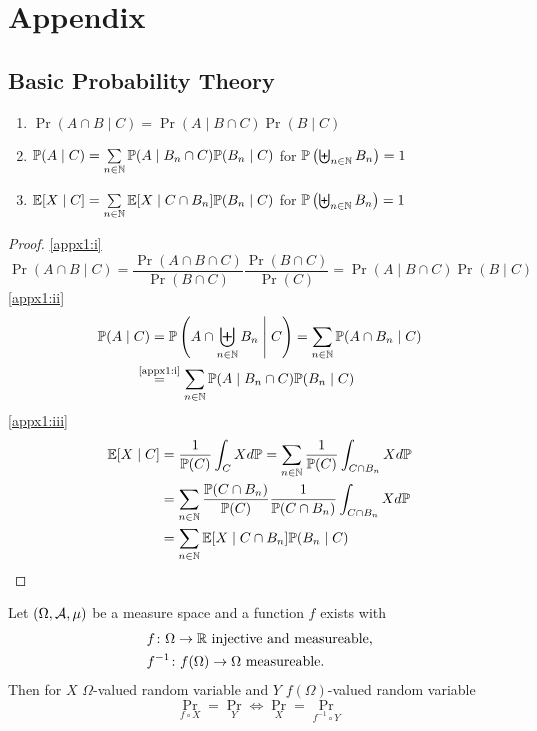 \chapter{Appendix}
\section{Basic Probability Theory}
\begin{lemma}\leavevmode \label{appx1}
    \begin{enumerate}[label=(\roman*), font=\normalfont]
        \item\label{appx1:i} \(\Pr(A\cap B\mid C) = \Pr(A \mid B \cap C)\Pr(B\mid C) \)
        \item\label{appx1:ii} \(\mathbb{P}(A\mid C)=\sum\limits_{n\in\mathbb{N}} \mathbb{P}(A \mid B_n \cap C)\mathbb{P}(B_n\mid C)  \)
        for  \(\mathbb{P}\left(\biguplus_{n\in\mathbb{N}}B_n\right)=1 \)
        \item\label{appx1:iii} \(\mathbb{E}[X\mid C]=\sum\limits_{n\in\mathbb{N}} \mathbb{E}[X\mid C \cap B_n] \mathbb{P}(B_n \mid C) \) for  \(\mathbb{P}\left(\biguplus_{n\in\mathbb{N}}B_n\right)=1 \)
    \end{enumerate}
\end{lemma}
\begin{proof}
    \ref{appx1:i}
    \[
        \Pr(A\cap B\mid C)
        =\frac{\Pr(A\cap B\cap C)}{\Pr(B\cap C)}\frac{\Pr(B\cap C)}{\Pr(C)}
        =\Pr(A\mid B\cap C)\Pr(B\mid C)
    \]
    \ref{appx1:ii}
    \begin{align*}
        \Pr(A\mid C)&=\Pr\left(A\cap \biguplus_{n\in\N} B_n \;\middle|\; C\right)
        =\sum_{n\in\N} \Pr(A\cap B_n\mid C)\\
        &\lxeq{\text{\ref{appx1:i}}} \sum_{n\in\N} \Pr(A \mid B_n \cap C)\Pr(B_n\mid C)
    \end{align*}
    \ref{appx1:iii}
    \begin{align*}
        \mathbb{E}[X\mid C]
        &=\frac{1}{\mathbb{P}(C)} \int_C X d\mathbb{P} 
        =\sum_{n\in\mathbb{N}}\frac{1}{\mathbb{P}(C)} \int_{C\cap B_n} X d\mathbb{P}\\
        &=\sum_{n\in\mathbb{N}} \frac{\mathbb{P}(C\cap B_n)}{\mathbb{P}(C)} \frac{1}{\mathbb{P}(C\cap B_n)} 
        \int_{C\cap B_n} X d\mathbb{P} \\
        &=\sum_{n\in\mathbb{N}}\mathbb{E}[X\mid C\cap B_n]\mathbb{P}(B_n\mid C) \qedhere
    \end{align*}
\end{proof}
\begin{lemma}\label{appx2}
    Let \((\Omega,\mathcal{A},\mu)\) be a measure space and a function \(f\) exists with
    \begin{align*}
        &f\colon \Omega \to \mathbb{R} \text{ injective and measureable,} \\
        &f^{-1}\colon f(\Omega)\to \Omega \text{ measureable.}
    \end{align*}
    Then for \(X\) \(\Omega\)-valued random variable and
    \(Y\) \(f(\Omega)\)-valued random variable
    \[
        \Pr_{f\circ X} =\Pr_Y \iff \Pr_X=\Pr_{f^{-1}\circ Y}
    \]
\end{lemma}
